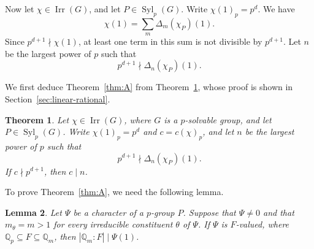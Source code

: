 \documentclass[reqno]{amsart}
\newtheorem{thm}{Theorem}[section]
\newtheorem{lem}[thm]{Lemma}
\theoremstyle{definition}
\theoremstyle{remark}
\numberwithin{equation}{section}
\DeclareMathOperator{\Irr}{Irr}
\DeclareMathOperator{\Syl}{Syl}
\theoremstyle{plain}
\begin{document}
Now let $\chi\in\Irr(G)$, and let $P\in\Syl_p(G)$.
Write $\chi(1)_p=p^d$. We have
\[
  \chi(1)=\sum_m\Delta_m(\chi_P)(1).
\]
Since $p^{d+1}\nmid\chi(1)$, at least one term in this sum is
not divisible by $p^{d+1}$.
Let $n$ be the largest power of $p$ such that
\begin{equation}\label{eq:selection}
  p^{d+1}\nmid\Delta_n(\chi_P)(1).
\end{equation}

We first deduce Theorem~\ref{thm:A} from
Theorem~\ref{thm:selected-exponent}, whose proof is shown in
Section~\ref{sec:linear-rational}.

\begin{thm}\label{thm:selected-exponent}
Let $\chi\in\Irr(G)$, where $G$ is a $p$-solvable group,
and let $P\in\Syl_p(G)$.
Write $\chi(1)_p=p^d$ and $c=c(\chi)_p$, and let $n$ be the
largest power of $p$ such that
\[
  p^{d+1}\nmid\Delta_n(\chi_P)(1).
\]
If $c\nmid p^{d+1}$, then $c\mid n$.
\end{thm}


To prove Theorem~\ref{thm:A}, we need the following lemma.

\begin{lem}\label{lem:field-degree}
Let $\Psi$ be a character of a $p$-group $P$.
Suppose that $\Psi\neq0$ and that $m_\theta=m>1$ for every
irreducible constituent $\theta$ of $\Psi$.
If $\Psi$ is $F$-valued, where
$\mathbb{Q}_p\subseteq F\subseteq\mathbb{Q}_m$, then
$|\mathbb{Q}_m:F|\mid\Psi(1)$.
\end{lem}
\end{document}
